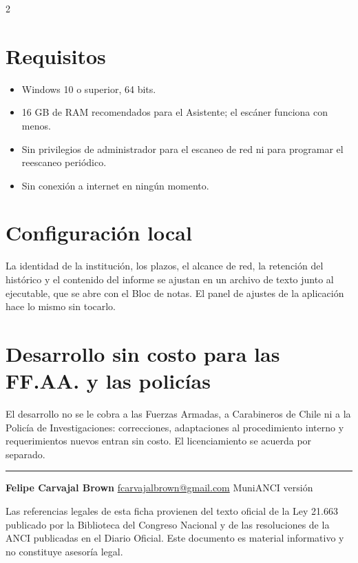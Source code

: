 \documentclass[10pt,a4paper]{article}
\newcommand{\barra}{\textcolor{azul}{\rule{\linewidth}{1.2pt}}}
\begin{document}
\begin{multicols}{2}
\section{Requisitos}
\begin{itemize}
\item Windows 10 o superior, 64 bits.
\item 16 GB de RAM recomendados para el Asistente; el escáner funciona con menos.
\item Sin privilegios de administrador para el escaneo de red ni para programar el
reescaneo periódico.
\item Sin conexión a internet en ningún momento.
\end{itemize}

\section{Configuración local}

La identidad de la institución, los plazos, el alcance de red, la retención del histórico y
el contenido del informe se ajustan en un archivo de texto junto al ejecutable, que se abre
con el Bloc de notas. El panel de ajustes de la aplicación hace lo mismo sin tocarlo.

\section{Desarrollo sin costo para las FF.AA. y las policías}

El desarrollo no se le cobra a las Fuerzas Armadas, a Carabineros de Chile ni a la Policía
de Investigaciones: correcciones, adaptaciones al procedimiento interno y requerimientos
nuevos entran sin costo. El licenciamiento se acuerda por separado.
\end{multicols}

\vspace{4pt}
\barra

\vspace{2pt}

{\footnotesize\color{gris}
\textbf{Felipe Carvajal Brown} \quad\textbullet\quad
\href{mailto:fcarvajalbrown@gmail.com}{fcarvajalbrown@gmail.com} \quad\textbullet\quad
MuniANCI versión \version

\vspace{2pt}
Las referencias legales de esta ficha provienen del texto oficial de la Ley 21.663
publicado por la Biblioteca del Congreso Nacional y de las resoluciones de la ANCI
publicadas en el Diario Oficial. Este documento es material informativo y no constituye
asesoría legal.
}
\end{document}
